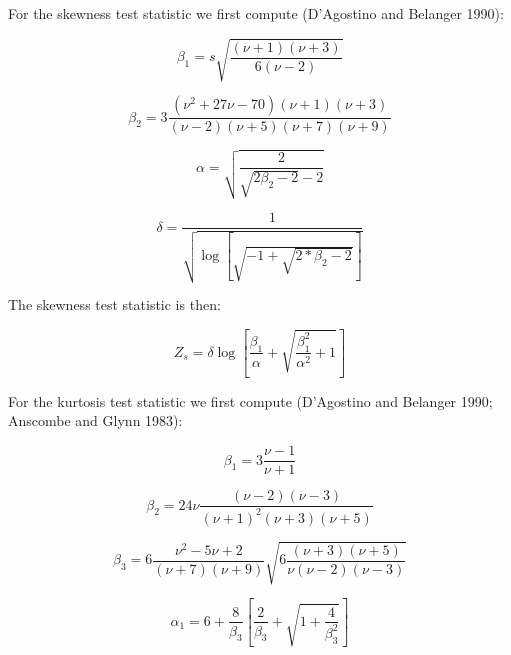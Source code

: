 \documentclass[preprint,12pt,authoryear]{elsarticle}
\begin{document}
For the skewness test statistic we first compute (D'Agostino and
Belanger 1990):

\begin{equation}
\beta_1 = s \sqrt{ \frac{\left(\nu + 1\right) \left(\nu + 3\right)} {6 \left(\nu - 2\right)} }
\end{equation}

\begin{equation}
\beta_2 = 3 \frac{\left(\nu^2 + 27\nu - 70\right) \left(\nu + 1\right) \left(\nu + 3\right)} {\left(\nu - 2\right) \left(\nu + 5\right) \left(\nu + 7\right) \left(\nu + 9\right)}
\end{equation}

\begin{equation}
\alpha = \sqrt{\frac{2} {\sqrt{2 \beta_2 - 2} - 2}}
\end{equation}

\begin{equation}
\delta = \frac{1}{\sqrt{\log \left[\sqrt{-1 + \sqrt{2 * \beta_2 - 2}} \right]}}
\end{equation}

The skewness test statistic is then:

\begin{equation}
Z_s = \delta \log\left[\frac{\beta_1}{\alpha} + \sqrt{\frac{\beta_1^2}{\alpha^2} + 1} \right]
\end{equation}

For the kurtosis test statistic we first compute (D'Agostino and
Belanger 1990; Anscombe and Glynn 1983):

\begin{equation}
\beta_1 = 3 \frac{\nu - 1}{\nu + 1}
\end{equation}

\begin{equation}
\beta_2 = 24 \nu \frac{\left(\nu - 2\right)\left(\nu - 3\right)}{\left(\nu + 1\right)^2 \left(\nu + 3\right) \left(\nu + 5\right)}
\end{equation}

\begin{equation}
\beta_3 = 6 \frac{\nu^2 - 5 \nu + 2}{\left(\nu + 7\right) \left(\nu + 9\right)} \sqrt{6 \frac{\left(\nu + 3\right) \left(\nu + 5\right)}{\nu \left(\nu - 2\right) \left(\nu - 3 \right)}}
\end{equation}

\begin{equation}
\alpha_1 = 6 + \frac{8}{\beta_3} \left[\frac{2}{\beta_3} + \sqrt{1 + \frac{4}{\beta_3^2}} \right]
\end{equation}
\end{document}
